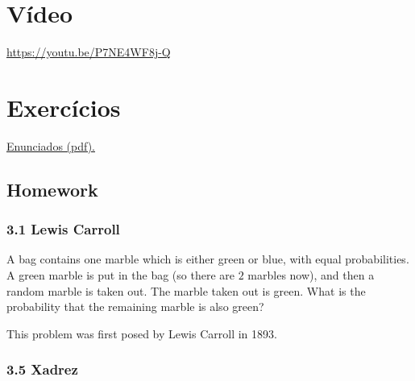 \documentclass[
  11pt]{report}
\begin{document}
\hypertarget{vuxeddeo-3}{%
\section*{Vídeo}\label{vuxeddeo-3}}

\begin{center} \url{https://youtu.be/P7NE4WF8j-Q} \end{center}

\hypertarget{exercuxedcios-3}{%
\section*{Exercícios}\label{exercuxedcios-3}}

\href{https://projects.iq.harvard.edu/files/stat110/files/strategic_practice_and_homework_2.pdf}{Enunciados (pdf).}

\hypertarget{homework-1}{%
\subsection*{Homework}\label{homework-1}}

\hypertarget{lewis-carroll}{%
\subsubsection*{3.1 Lewis Carroll}\label{lewis-carroll}}

\begin{rmdbox}
A bag contains one marble which is either green or blue, with equal probabilities. A green marble is put in the bag (so there are $2$ marbles now), and then a random marble is taken out. The marble taken out is green. What is the probability that the remaining marble is also green?

This problem was first posed by Lewis Carroll in 1893.

\end{rmdbox}

\hypertarget{xadrez}{%
\subsubsection*{3.5 Xadrez}\label{xadrez}}
\end{document}
